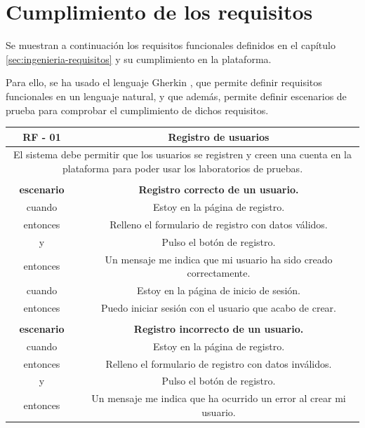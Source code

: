     \section{Cumplimiento de los requisitos}
        
        Se muestran a continuación los requisitos funcionales definidos en el capítulo \ref{sec:ingenieria-requisitos} y su cumplimiento en la plataforma.
        
        Para ello, se ha usado el lenguaje Gherkin \cite{gherkin}, que permite definir requisitos funcionales en un lenguaje natural, y que además, permite definir escenarios de prueba para comprobar el cumplimiento de dichos requisitos.

        \begin{table}[!htbp]
            \centering

            \begin{tabular}{|c|c|}
                \hline
                \textbf{RF - 01} & \textbf{Registro de usuarios} \\
                \hline
                \multicolumn{2}{|p{15cm}|}{
                    El sistema debe permitir que los usuarios se registren y creen una cuenta en la plataforma para poder usar los laboratorios de pruebas.
                } \\                    
                \hline
                \multicolumn{2}{|p{15cm}|}{
                } \\
                \hline
                \textbf{escenario} & \textbf{Registro correcto de un usuario.} \\
                cuando & Estoy en la página de registro. \\
                entonces & Relleno el formulario de registro con datos válidos. \\
                y & Pulso el botón de registro. \\
                entonces & Un mensaje me indica que mi usuario ha sido creado correctamente. \\
                cuando & Estoy en la página de inicio de sesión. \\
                entonces & Puedo iniciar sesión con el usuario que acabo de crear. \\
                \hline
                \multicolumn{2}{|p{15cm}|}{
                } \\
                \hline
                \textbf{escenario} & \textbf{Registro incorrecto de un usuario.} \\
                cuando & Estoy en la página de registro. \\
                entonces & Relleno el formulario de registro con datos inválidos. \\
                y & Pulso el botón de registro. \\
                entonces & Un mensaje me indica que ha ocurrido un error al crear mi usuario. \\
                \hline
            \end{tabular}
        \end{table}

